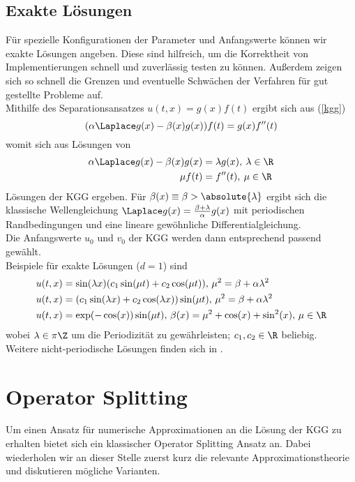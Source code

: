 \subsection{Exakte Lösungen}
Für spezielle Konfigurationen der Parameter und Anfangswerte können wir exakte Lösungen angeben. Diese sind hilfreich, um die Korrektheit von Implementierungen schnell und zuverlässig testen zu können. Außerdem zeigen sich so schnell die Grenzen und eventuelle Schwächen der Verfahren für gut gestellte Probleme auf.\\[1cm]
Mithilfe des Separationsansatzes $u(t,x)=g(x)f(t)$ ergibt sich aus (\ref{kgg}) 
\begin{equation*}
(\alpha\Laplace g(x)-\beta(x)g(x))f(t) = g(x)f''(t)
\end{equation*}
womit sich aus Lösungen von
\begin{align*}
\alpha\Laplace g(x)-\beta(x)g(x)&=\lambda g(x), \: \lambda\in\R\\
\mu f(t)&=f''(t), \: \mu\in \R
\end{align*}
Lösungen der KGG ergeben. Für $\beta(x) \equiv \beta>\absolute{\lambda}$ ergibt sich die klassische Wellengleichung $\Laplace g(x)=\frac{\beta + \lambda}{\alpha}g(x)$ mit periodischen Randbedingungen und eine lineare gewöhnliche Differentialgleichung.\\Die Anfangswerte $u_0$ und $v_0$ der KGG werden dann entsprechend passend gewählt.\\[1cm]
Beispiele für exakte Lösungen ($d=1$) sind
\begin{align*}
u(t,x)&=\sin(\lambda x)(c_1 \sin(\mu t) + c_2 \cos(\mu t)), \, \mu^2=\beta+\alpha \lambda^2\\ 
u(t,x)&=(c_1 \sin(\lambda x) + c_2 \cos(\lambda x))\sin(\mu t), \, \mu^2=\beta+\alpha \lambda^2\\
u(t,x)&=\exp(-\cos(x))\sin(\mu t), \, \beta(x)=\mu^2+\cos(x)+\sin^2(x), \, \mu \in \R
\end{align*}
wobei $\lambda\in \pi\Z$ um die Periodizität zu gewährleisten; $c_1, c_2 \in \R$ beliebig.\\
Weitere nicht-periodische Lösungen finden sich in \autocite{andreipolyanin2004}.

\section{Operator Splitting}
Um einen Ansatz für numerische Approximationen an die Lösung der KGG zu erhalten bietet sich ein klassischer Operator Splitting Ansatz an. Dabei wiederholen wir an dieser Stelle zuerst kurz die relevante Approximationstheorie und diskutieren mögliche Varianten.
